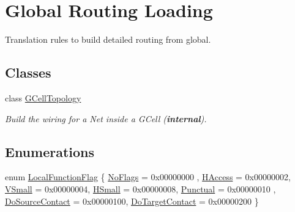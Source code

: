 \hypertarget{group__LoadGlobalRouting}{}\section{Global Routing Loading}
\label{group__LoadGlobalRouting}


Translation rules to build detailed routing from global.  


\subsection*{Classes}
\begin{DoxyCompactItemize}
\item 
class \mbox{\hyperlink{classanonymous__namespace_02LoadGrByNet_8cpp_03_1_1GCellTopology}{G\+Cell\+Topology}}
\begin{DoxyCompactList}\small\item\em Build the wiring for a Net inside a G\+Cell ({\bfseries internal}). \end{DoxyCompactList}\end{DoxyCompactItemize}
\subsection*{Enumerations}
\begin{DoxyCompactItemize}
\item 
enum \mbox{\hyperlink{group__LoadGlobalRouting_gaec07c7f30c801c3b0f72193757250d64}{Local\+Function\+Flag}} \{ \newline
\mbox{\hyperlink{group__LoadGlobalRouting_ggaec07c7f30c801c3b0f72193757250d64add44bf8d6f7bbe1393d76b940b85294b}{No\+Flags}} = 0x00000000
, \newline
\mbox{\hyperlink{group__LoadGlobalRouting_ggaec07c7f30c801c3b0f72193757250d64a5c3692a6c886c6293a3c9f240b60a5d9}{H\+Access}} = 0x00000002, 
\newline
\mbox{\hyperlink{group__LoadGlobalRouting_ggaec07c7f30c801c3b0f72193757250d64a260f6bf57246879aed7febfe83c9dacc}{V\+Small}} = 0x00000004, 
\newline
\mbox{\hyperlink{group__LoadGlobalRouting_ggaec07c7f30c801c3b0f72193757250d64af1a4f1cb841460f20d26dcf902247fb8}{H\+Small}} = 0x00000008, 
\newline
\mbox{\hyperlink{group__LoadGlobalRouting_ggaec07c7f30c801c3b0f72193757250d64a65b52a199afe857e3d551dbac8b293b9}{Punctual}} = 0x00000010
, \newline
\mbox{\hyperlink{group__LoadGlobalRouting_ggaec07c7f30c801c3b0f72193757250d64aece46caaf822b33d7db94bb2dd16a30d}{Do\+Source\+Contact}} = 0x00000100, 
\newline
\mbox{\hyperlink{group__LoadGlobalRouting_ggaec07c7f30c801c3b0f72193757250d64aeb33c01c5e62df73de6b11888b17a5f2}{Do\+Target\+Contact}} = 0x00000200
 \}
\end{DoxyCompactItemize}
